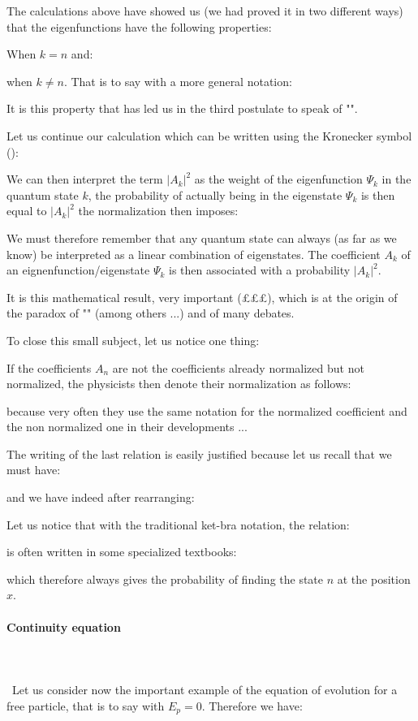 	The calculations above have showed us (we had proved it in two different ways) that the eigenfunctions have the following properties:
	
	When $k=n$ and:
	
	when $k\neq n$. That is to say with a more general notation:
	
	It is this property that has led us in the third postulate to speak of "".
	
	Let us continue our calculation which can be written using the Kronecker symbol ():
	
	We can then interpret the term $|A_k|^2$ as the weight of the eigenfunction $\Psi_k$ in the quantum state $k$, the probability of actually being in the eigenstate $\Psi_k$ is then equal to $|A_k|^2$ the normalization then imposes:
	
	We must therefore remember that any quantum state can always (as far as we know) be interpreted as a linear combination of eigenstates. The coefficient $A_k$ of an eignenfunction/eigenstate $\Psi_k$ is then associated with a probability $|A_k|^2$.
	
	It is this mathematical result, very important (£££), which is at the origin of the paradox of "" (among others ...) and of many debates.

	To close this small subject, let us notice one thing:

	If the coefficients $A_n$ are not the coefficients already normalized but not normalized, the physicists then denote their normalization as follows:
	
	because very often they use the same notation for the normalized coefficient and the non normalized one in their developments ...

The writing of the last relation is easily justified because let us recall that we must have:
	
	and we have indeed after rearranging:
	
	Let us notice that with the traditional ket-bra notation, the relation:
	
	is often written in some specialized textbooks:
	
	which therefore always gives the probability of finding the state $n$ at the position $x$.
	
	\paragraph{Continuity equation}\mbox{}\\\\\
	Let us consider now the important example of the equation of evolution for a free particle, that is to say with $E_p=0$. Therefore we have:
	
